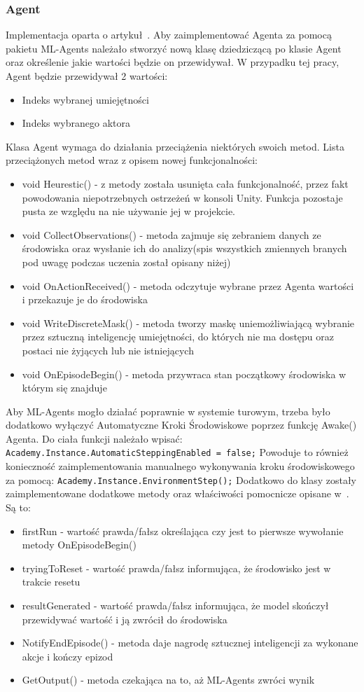 \documentclass{SGGW-thesis}
\begin{document}
\subsubsection{Agent}
Implementacja oparta o artykuł~\cite{MLAgentsStartegyGuide}. Aby zaimplementować Agenta za pomocą pakietu ML-Agents należało stworzyć nową klasę dziedziczącą po klasie Agent oraz określenie jakie wartości będzie on przewidywał. 
W przypadku tej pracy, Agent będzie przewidywał 2 wartości: 
\begin{itemize}
  \item{Indeks wybranej umiejętności}
  \item{Indeks wybranego aktora}
\end{itemize}
Klasa Agent wymaga do działania przeciążenia niektórych swoich metod. Lista przeciążonych metod wraz z opisem nowej funkcjonalności:
\begin{itemize}
  \item{void Heurestic() - z metody została usunięta cała funkcjonalność, przez fakt powodowania niepotrzebnych ostrzeżeń w konsoli Unity. Funkcja pozostaje pusta ze względu na nie używanie jej w projekcie.}
  \item{void CollectObservations() - metoda zajmuje się zebraniem danych ze środowiska oraz wysłanie ich do analizy(spis wszystkich zmiennych branych pod uwagę podczas uczenia został opisany niżej)}
  \item{void OnActionReceived() - metoda odczytuje wybrane przez Agenta wartości i przekazuje je do środowiska}
  \item{void WriteDiscreteMask() - metoda tworzy maskę uniemożliwiającą wybranie przez sztuczną inteligencję umiejętności, do których nie ma dostępu oraz postaci nie żyjących lub nie istniejących}
  \item{void OnEpisodeBegin() - metoda przywraca stan początkowy środowiska w którym się znajduje}
\end{itemize}
Aby ML-Agents mogło działać poprawnie w systemie turowym, trzeba było dodatkowo wyłączyć Automatyczne Kroki Środowiskowe poprzez funkcję Awake() Agenta. Do ciała funkcji należało wpisać: \verb|Academy.Instance.AutomaticSteppingEnabled = false;|
Powoduje to również konieczność zaimplementowania manualnego wykonywania kroku środowiskowego za pomocą: \verb|Academy.Instance.EnvironmentStep();|
Dodatkowo do klasy zostały zaimplementowane dodatkowe metody oraz właściwości pomocnicze opisane w~\cite{MLAgentsStartegyGuide}. Są to:
\begin{itemize}
  \item{firstRun - wartość prawda/fałsz określająca czy jest to pierwsze wywołanie metody OnEpisodeBegin()}
  \item{tryingToReset - wartość prawda/fałsz informująca, że środowisko jest w trakcie resetu}
  \item{resultGenerated - wartość prawda/fałsz informująca, że model skończył przewidywać wartość i ją zwrócił do środowiska}
  \item{NotifyEndEpisode() - metoda daje nagrodę sztucznej inteligencji za wykonane akcje i kończy epizod}
  \item{GetOutput() - metoda czekająca na to, aż ML-Agents zwróci wynik}
\end{itemize}
\end{document}
